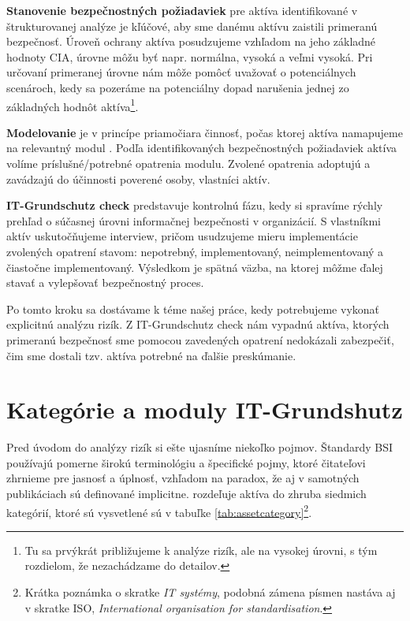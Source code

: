 \textbf{Stanovenie bezpečnostných požiadaviek} pre aktíva identifikované v štrukturovanej analýze je kľúčové, aby sme danému aktívu zaistili primeranú
bezpečnosť. Úroveň ochrany aktíva posudzujeme vzhľadom na jeho základné hodnoty CIA, úrovne môžu byť napr. normálna, vysoká a veľmi vysoká.
Pri určovaní primeranej úrovne nám môže pomôcť uvažovať o potenciálnych scenároch, kedy sa pozeráme na potenciálny dopad narušenia jednej
zo základných hodnôt aktíva\footnote{Tu sa prvýkrát približujeme k analýze rizík, ale na vysokej úrovni, s tým rozdielom, že nezachádzame do detailov.}.

\textbf{Modelovanie} je v princípe priamočiara činnosť, počas ktorej aktíva namapujeme na relevantný modul \cite{GSK}. Podľa identifikovaných bezpečnostných
požiadaviek aktíva volíme príslušné/potrebné opatrenia modulu. Zvolené opatrenia adoptujú a zavádzajú do účinnosti poverené osoby, vlastníci aktív.

\textbf{IT-Grundschutz check} predstavuje kontrolnú fázu, kedy si spravíme rýchly prehľad o súčasnej úrovni informačnej bezpečnosti v organizácií. S vlastníkmi
aktív uskutočňujeme interview, pričom usudzujeme mieru implementácie zvolených opatrení stavom: nepotrebný, implementovaný, neimplementovaný a čiastočne
implementovaný. Výsledkom je spätná väzba, na ktorej môžme ďalej stavať a vylepšovať bezpečnostný proces.

Po tomto kroku sa dostávame k téme našej práce, kedy potrebujeme vykonať explicitnú analýzu rizík. Z IT-Grundschutz check nám vypadnú aktíva, ktorých
primeranú bezpečnosť sme pomocou zavedených opatrení nedokázali zabezpečiť, čim sme dostali tzv. aktíva potrebné na ďalšie preskúmanie.


\section{Kategórie a moduly IT-Grundshutz}

Pred úvodom do analýzy rizík si ešte ujasníme niekoľko pojmov. Štandardy BSI používajú pomerne širokú terminológiu a špecifické pojmy, ktoré čitateľovi
zhrnieme pre jasnosť a úplnosť, vzhľadom na paradox, že aj v samotných publikáciach sú definované implicitne. \cite{GSK} rozdeľuje aktíva do zhruba siedmich
kategórií, ktoré sú vysvetlené sú v tabuľke \ref{tab:assetcategory}\footnote{Krátka poznámka o skratke \emph{IT systémy}, podobná zámena písmen nastáva aj
v skratke ISO, \emph{International organisation for standardisation}.}.

